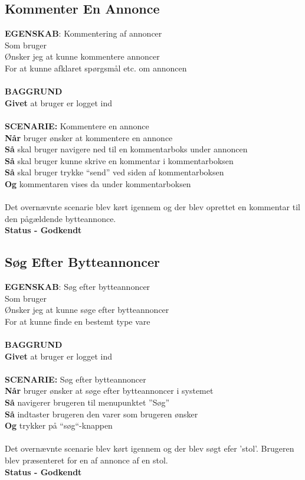\subsection{Kommenter En Annonce}
{\color{blue}\textbf{EGENSKAB}:} Kommentering af annoncer \\
Som bruger \\
Ønsker jeg at kunne kommentere annoncer \\
For at kunne afklaret spørgsmål etc. om annoncen\\ \\
{\color{blue}\textbf{BAGGRUND}} \\
{\color{blue}\textbf{Givet}} at bruger er logget ind \\
\\
{\color{blue}\textbf{SCENARIE:}} Kommentere en annonce \\
{\color{blue}\textbf{Når}} bruger ønsker at kommentere en annonce
\\
{\color{blue}\textbf{Så}} skal bruger navigere ned til en kommentarboks under annoncen \\
{\color{blue}\textbf{Så}} skal bruger kunne skrive en kommentar i kommentarboksen\\
{\color{blue}\textbf{Så}} skal bruger trykke “send” ved siden af kommentarboksen \\
{\color{blue}\textbf{Og}} kommentaren vises da under kommentarboksen
\\ \\
Det overnævnte scenarie blev kørt igennem og der blev oprettet en kommentar til den pågældende bytteannonce. \\
\textbf{Status - Godkendt}

\subsection{Søg Efter Bytteannoncer}
{\color{blue}\textbf{EGENSKAB}:} Søg efter bytteannoncer \\
Som bruger \\
Ønsker jeg at kunne søge efter bytteannoncer \\
For at kunne finde en bestemt type vare\\ \\
{\color{blue}\textbf{BAGGRUND}} \\
{\color{blue}\textbf{Givet}} at bruger er logget ind \\
\\
{\color{blue}\textbf{SCENARIE:}} Søg efter bytteannoncer \\
{\color{blue}\textbf{Når}} bruger ønsker at søge efter bytteannoncer i systemet\\
{\color{blue}\textbf{Så}} navigerer brugeren til menupunktet ”Søg” \\
{\color{blue}\textbf{Så}} indtaster brugeren den varer som brugeren ønsker\\
{\color{blue}\textbf{Og}} trykker på “søg“-knappen \\ \\
Det overnævnte scenarie blev kørt igennem og der blev søgt efer 'stol'. Brugeren blev præsenteret for en af annonce af en stol. \\
\textbf{Status - Godkendt}

